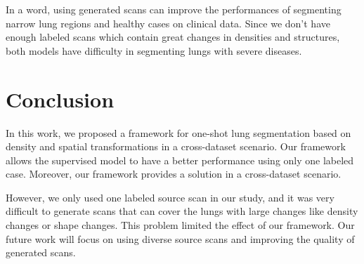 \documentclass{article}
\begin{document}
In a word, using generated scans can improve the performances of segmenting narrow lung regions and healthy cases on clinical data. Since we don't have enough labeled scans which contain great changes in densities and structures, both models have difficulty in segmenting lungs with severe diseases.

\section{Conclusion}
\label{sec:discussconclusion}
In this work, we proposed a framework for one-shot lung segmentation based on density and spatial transformations in a cross-dataset scenario. Our framework allows the supervised model to have a better performance using only one labeled case. Moreover, our framework provides a solution in a cross-dataset scenario.

However, we only used one labeled source scan in our study, and it was very difficult to generate scans that can cover the lungs with large changes like density changes or shape changes. This problem limited the effect of our framework. Our future work will focus on using diverse source scans and improving the quality of generated scans.



\end{document}
